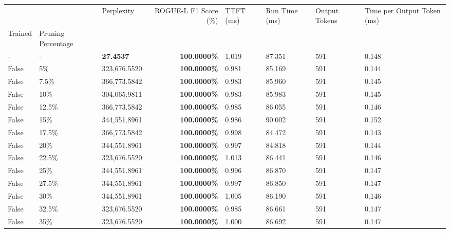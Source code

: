 \begin{table}[H]
\label{tab:evaluation-pipeline-4-untrained}
\begin{tabular}{lllrllll}
\toprule
 &  & Perplexity & ROGUE-L F1 Score (\%) & TTFT (ms) & Run Time (ms) & Output Tokens & Time per Output Token (ms) \\
Trained & Pruning Percentage &  &  &  &  &  &  \\
\midrule
- & - & \bfseries 27.4537 & \bfseries 100.0000\% & 1.019 & 87.351 & 591 & 0.148 \\
\cline{1-8} \cline{2-8}
False & 5\% & 323,676.5520 & \bfseries \color{red} 100.0000\% & 0.981 & 85.169 & 591 & 0.144 \\
\cline{1-8} \cline{2-8}
False & 7.5\% & 366,773.5842 & \bfseries \color{red} 100.0000\% & 0.983 & 85.960 & 591 & 0.145 \\
\cline{1-8} \cline{2-8}
False & 10\% & \color{red} 304,065.9811 & \bfseries \color{red} 100.0000\% & 0.983 & 85.983 & 591 & 0.145 \\
\cline{1-8} \cline{2-8}
False & 12.5\% & 366,773.5842 & \bfseries \color{red} 100.0000\% & 0.985 & 86.055 & 591 & 0.146 \\
\cline{1-8} \cline{2-8}
False & 15\% & 344,551.8961 & \bfseries \color{red} 100.0000\% & 0.986 & 90.002 & 591 & 0.152 \\
\cline{1-8} \cline{2-8}
False & 17.5\% & 366,773.5842 & \bfseries \color{red} 100.0000\% & 0.998 & 84.472 & 591 & 0.143 \\
\cline{1-8} \cline{2-8}
False & 20\% & 344,551.8961 & \bfseries \color{red} 100.0000\% & 0.997 & 84.818 & 591 & 0.144 \\
\cline{1-8} \cline{2-8}
False & 22.5\% & 323,676.5520 & \bfseries \color{red} 100.0000\% & 1.013 & 86.441 & 591 & 0.146 \\
\cline{1-8} \cline{2-8}
False & 25\% & 344,551.8961 & \bfseries \color{red} 100.0000\% & 0.996 & 86.870 & 591 & 0.147 \\
\cline{1-8} \cline{2-8}
False & 27.5\% & 344,551.8961 & \bfseries \color{red} 100.0000\% & 0.997 & 86.850 & 591 & 0.147 \\
\cline{1-8} \cline{2-8}
False & 30\% & 344,551.8961 & \bfseries \color{red} 100.0000\% & 1.005 & 86.190 & 591 & 0.146 \\
\cline{1-8} \cline{2-8}
False & 32.5\% & 323,676.5520 & \bfseries \color{red} 100.0000\% & 0.985 & 86.661 & 591 & 0.147 \\
\cline{1-8} \cline{2-8}
False & 35\% & 323,676.5520 & \bfseries \color{red} 100.0000\% & 1.000 & 86.692 & 591 & 0.147 \\

\end{tabular}
\end{table}
